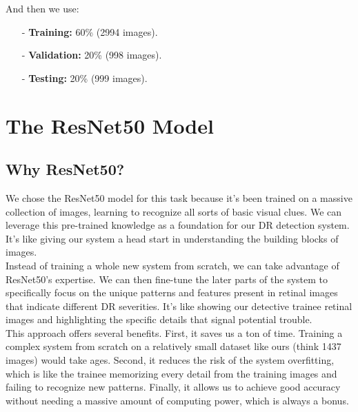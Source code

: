 \documentclass[conference]{IEEEtran}
\begin{document}
And then we use:
\begin{itemize}
    \item[-] \textbf{Training:} 60\% (2994 images).
    \item[-] \textbf{Validation:} 20\% (998 images).
    \item[-] \textbf{Testing:} 20\% (999 images).\\
\end{itemize}

\section{\textbf{The ResNet50 Model}}

\subsection{Why ResNet50?}

We chose the ResNet50 model for this task because it's been trained on a massive collection of images, learning to recognize all sorts of basic visual clues. We can leverage this pre-trained knowledge as a foundation for our DR detection system. It's like giving our system a head start in understanding the building blocks of images. \\

Instead of training a whole new system from scratch, we can take advantage of ResNet50's expertise. We can then fine-tune the later parts of the system to specifically focus on the unique patterns and features present in retinal images that indicate different DR severities. It's like showing our detective trainee retinal images and highlighting the specific details that signal potential trouble. \\

This approach offers several benefits. First, it saves us a ton of time. Training a complex system from scratch on a relatively small dataset like ours (think 1437 images) would take ages. Second, it reduces the risk of the system overfitting, which is like the trainee memorizing every detail from the training images and failing to recognize new patterns. Finally, it allows us to achieve good accuracy without needing a massive amount of computing power, which is always a bonus. \\
\end{document}
